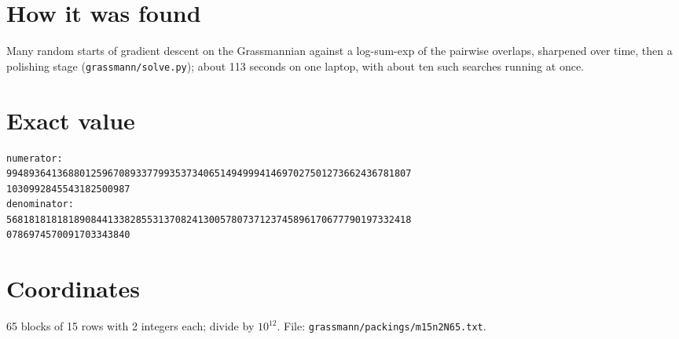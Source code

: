 \documentclass[11pt,a4paper]{article}
\begin{document}
\section{How it was found}
Many random starts of gradient descent on the Grassmannian against a log-sum-exp of the pairwise overlaps, sharpened over time, then a polishing stage (\texttt{grassmann/solve.py}); about 113 seconds on one laptop, with about ten such searches running at once.


\appendix
\section{Exact value}
{\small
\begin{verbatim}
numerator:
994893641368801259670893377993537340651494999414697027501273662436781807
1030992845543182500987
denominator:
568181818181890844133828553137082413005780737123745896170677790197332418
0786974570091703343840
\end{verbatim}}

\section{Coordinates}
65 blocks of 15 rows with 2 integers each; divide by $10^{12}$. File: \texttt{grassmann/packings/m15n2N65.txt}.
{\tiny
\begin{multicols}{4}
\end{multicols}}
\end{document}
